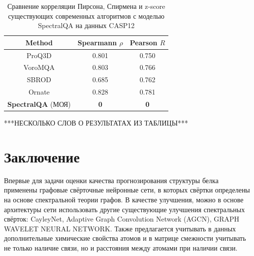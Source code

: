 \documentclass[14pt]{extarticle}
\begin{document}
\begin{center}
	\begin{table}[h]
		\centering
		\begin{tabular}{ccc}
			\hline Method & Spearmann $\rho$ &  Pearson $R$ \\
		\hline ProQ3D & 0.801 & 0.750 \\
		VoroMQA & 0.803 & 0.766  \\
		SBROD & 0.685 & 0.762  \\
		Ornate & 0.828 & 0.781   \\
		\textbf{SpectralQA} (МОЯ)&   \textbf{0}&   \textbf{0}    \\
		\hline 
		\end{tabular}
		\caption{Сравнение корреляции Пирсона, Спирмена и z-score существующих современных алгоритмов с моделью SpectralQA на данных CASP12}
		\label{Tab:1}
	\end{table}
\end{center}
***НЕСКОЛЬКО СЛОВ О РЕЗУЛЬТАТАХ ИЗ ТАБЛИЦЫ***



\section{Заключение}
Впервые для задачи оценки качества прогнозирования структуры белка применены графовые свёрточные нейронные сети, в которых свёртки определены на основе спектральной теории графов. В качестве улучшения, можно в основе архитектуры сети использовать другие существующие улучшения спектральных свёрток: CayleyNet, Adaptive Graph Convolution Network (AGCN), GRAPH WAVELET NEURAL NETWORK. Также предлагается учитывать в данных дополнительные химические свойства атомов и в матрице смежности учитывать не только наличие связи, но и расстояния между атомами при наличии связи.

\newpage




\newpage
{}


\nocite{*}
\end{document}
